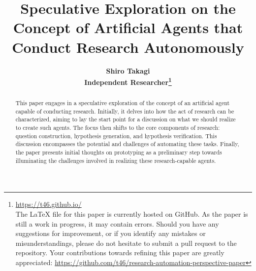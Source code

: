 \documentclass{article}
\title{\bfseries Speculative Exploration on the Concept of Artificial Agents that Conduct Research Autonomously}
\author{\normalsize \bfseries Shiro Takagi \\
\normalsize Independent Researcher\footnote{\href{https://t46.github.io/}{https://t46.github.io/} \\
The LaTeX file for this paper is currently hosted on GitHub. As the paper is still a work in progress, it may contain errors. Should you have any suggestions for improvement, or if you identify any mistakes or misunderstandings, please do not hesitate to submit a pull request to the repository. Your contributions towards refining this paper are greatly appreciated: \href{https://github.com/t46/research-automation-perspective-paper}{https://github.com/t46/research-automation-perspective-paper} }}
\date{}
\begin{document}
\sloppy
\maketitle


\begin{abstract}
This paper engages in a speculative exploration of the concept of an artificial agent capable of conducting research. Initially, it delves into how the act of research can be characterized, aiming to lay the start point for a discussion on what we should realize to create such agents. The focus then shifts to the core components of research: question construction, hypothesis generation, and hypothesis verification. This discussion encompasses the potential and challenges of automating these tasks. Finally, the paper presents initial thoughts on prototyping as a preliminary step towards illuminating the challenges involved in realizing these research-capable agents.
\end{abstract}

\tableofcontents




% 
% 
% 



% 


\appendix

\end{document}
